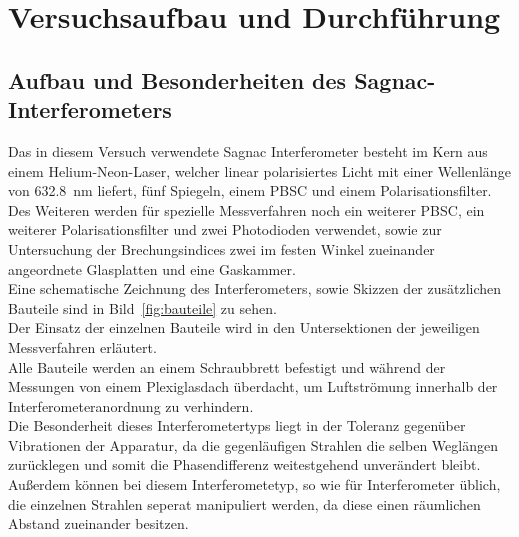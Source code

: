 
\section{Versuchsaufbau und Durchführung}

\subsection{Aufbau und Besonderheiten des Sagnac-Interferometers}
%
Das in diesem Versuch verwendete Sagnac Interferometer besteht im 
Kern aus einem Helium-Neon-Laser, welcher linear polarisiertes 
Licht mit einer Wellenlänge von \SI{632.8}{\nano\metre} liefert, 
fünf Spiegeln, einem PBSC und einem Polarisationsfilter.\\
Des Weiteren werden für spezielle Messverfahren noch ein weiterer 
PBSC, ein weiterer Polarisationsfilter und zwei Photodioden 
verwendet, sowie zur Untersuchung der Brechungsindices zwei im 
festen Winkel zueinander angeordnete Glasplatten und eine Gaskammer.\\
Eine schematische Zeichnung des Interferometers, sowie Skizzen der 
zusätzlichen Bauteile sind in Bild~\ref{fig:bauteile} zu sehen.\\
Der Einsatz der einzelnen Bauteile wird in den Untersektionen 
der jeweiligen Messverfahren erläutert.\\
Alle Bauteile werden an einem Schraubbrett befestigt und während 
der Messungen von einem Plexiglasdach überdacht, um Luftströmung 
innerhalb der Interferometeranordnung zu verhindern.\\
Die Besonderheit dieses Interferometertyps liegt in der 
Toleranz gegenüber Vibrationen der Apparatur, da die gegenläufigen 
Strahlen die selben Weglängen zurücklegen und somit die 
Phasendifferenz weitestgehend unverändert bleibt. Außerdem können  
bei diesem Interferometetyp, so wie für Interferometer üblich, die 
einzelnen Strahlen seperat manipuliert werden, da diese einen 
räumlichen Abstand zueinander besitzen.\\
%
